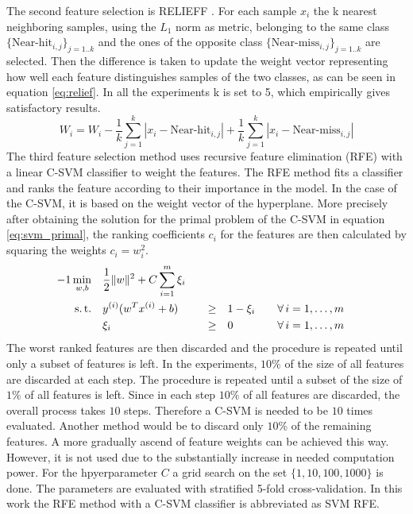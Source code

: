 \documentclass[twoside,11pt]{article}
\begin{document}
The second feature selection is RELIEFF \citep{kononenko1997overcoming}. For each sample $x_i$ the k nearest neighboring samples, using the $L_1$ norm as metric, belonging to the same class $\{\textrm{Near-hit}_{i, j}\}_{j=1..k}$ and the ones of the opposite class $\{\textrm{Near-miss}_{i, j}\}_{j=1..k}$ are selected. Then the difference is taken to update the weight vector representing how well each feature distinguishes samples of the two classes, as can be seen in equation \ref{eq:relief}. In all the experiments k is set to 5, which empirically gives satisfactory results.
\begin{equation}
  \label{eq:relief}
  W_i = W_i - \frac{1}{k}\sum_{j=1}^{k}|x_i - \textrm{Near-hit}_{i,j}| + \frac{1}{k}\sum_{j=1}^{k} |x_i - \textrm{Near-miss}_{i,j}|
\end{equation}
The third feature selection method uses recursive feature elimination (RFE) with a linear C-SVM classifier \citep{guyon2002gene} to weight the features. 
The RFE method fits a classifier and ranks the feature according to their importance in the model. In the case of the C-SVM, it is based on the weight vector of the hyperplane. More precisely after obtaining the solution for the primal problem of the C-SVM in equation \ref{eq:svm_primal}, the ranking coefficients $c_i$ for the features are then calculated by squaring the weights $c_i = w_i^2$.
\begin{alignat}{-1}
     \min_{w,b}  & \quad \frac12\|w\|^2 + C\sum_{i=1}^m \xi_i & & & \label{eq:svm_primal} \\ 
   \text{s.\,t.} & \quad y^{(i)} (w^Tx^{(i)} + b) & \quad \geq & \quad 1 -\xi_i &&
                   \quad \forall \, i = 1, \ldots, m \nonumber \\
                 & \quad \xi_i                  & \quad \geq & \quad 0 &&
                   \quad \forall \, i = 1, \ldots, m \nonumber 
\end{alignat}
The worst ranked features are then discarded and the procedure is repeated until only a subset of features is left. In the experiments, $10\%$ of the size of all features are discarded at each step. The procedure is repeated until a subset of the size of $1\%$ of all features is left. Since in each step $10\%$ of all features are discarded, the overall process takes $10$ steps. Therefore a C-SVM is needed to be $10$ times evaluated. Another method would be to discard only $10\%$ of the remaining features. A more gradually ascend of feature weights can be achieved this way. However, it is not used due to the substantially increase in needed computation power. For the hpyerparameter $C$ a grid search on the set $\{1, 10, 100, 1000\}$ is done. The parameters are evaluated with stratified 5-fold cross-validation. In this work the RFE method with a C-SVM classifier is abbreviated as SVM RFE.
\end{document}
